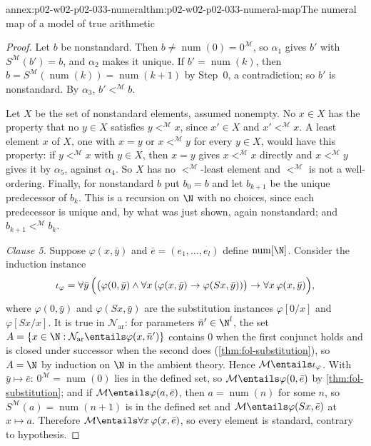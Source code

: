 \begin{annexitem}{annex:p02-w02-p02-033-numeral}{thm:p02-w02-p02-033-numeral-map}{The numeral map of a model of true arithmetic}
\begin{proof}
Let \(b\) be nonstandard.  Then \(b\ne\operatorname{num}(0)=0^{\mathcal M}\),
so \(\alpha_1\) gives \(b'\) with \(S^{\mathcal M}(b')=b\), and \(\alpha_2\)
makes it unique.  If \(b'=\operatorname{num}(k)\), then
\(b=S^{\mathcal M}(\operatorname{num}(k))=\operatorname{num}(k+1)\) by Step~0,
a contradiction; so \(b'\) is nonstandard.  By \(\alpha_3\),
\(b'<^{\mathcal M}b\).

Let \(X\) be the set of nonstandard elements, assumed nonempty.  No
\(x\in X\) has the property that no \(y\in X\) satisfies
\(y<^{\mathcal M}x\), since \(x'\in X\) and \(x'<^{\mathcal M}x\).  A least
element \(x\) of \(X\), one with \(x=y\) or \(x<^{\mathcal M}y\) for every
\(y\in X\), would have this property: if \(y<^{\mathcal M}x\) with \(y\in X\),
then \(x=y\) gives \(x<^{\mathcal M}x\) directly and \(x<^{\mathcal M}y\)
gives it by \(\alpha_5\), against \(\alpha_4\).  So \(X\) has no
\(<^{\mathcal M}\)-least element and \(<^{\mathcal M}\) is not a
well-ordering.  Finally, for nonstandard \(b\) put \(b_0=b\) and let
\(b_{k+1}\) be the unique predecessor of \(b_k\).  This is a recursion on
\(\N\) with no choices, since each predecessor is unique and, by what was
just shown, again nonstandard; and \(b_{k+1}<^{\mathcal M}b_k\).

\emph{Clause 5.}  Suppose \(\varphi(x,\bar y)\) and
\(\bar e=(e_1,\ldots,e_l)\) define \(\operatorname{num}[\N]\).  Consider the
induction instance
\[
 \iota_\varphi=\forall\bar y\,\Bigl(\bigl(\varphi(0,\bar y)\land
 \forall x\,(\varphi(x,\bar y)\to\varphi(Sx,\bar y))\bigr)\to
 \forall x\,\varphi(x,\bar y)\Bigr),
\]
where \(\varphi(0,\bar y)\) and \(\varphi(Sx,\bar y)\) are the substitution
instances \(\varphi[0/x]\) and \(\varphi[Sx/x]\).  It is true in
\(\mathcal N_{\mathrm{ar}}\): for parameters \(\bar n'\in\N^l\), the set
\(A=\{x\in\N:\mathcal N_{\mathrm{ar}}\entails\varphi(x,\bar n')\}\) contains
\(0\) when the first conjunct holds and is closed under successor when the
second does (\cref{thm:fol-substitution}), so \(A=\N\) by induction on \(\N\)
in the ambient theory.  Hence \(\mathcal M\entails\iota_\varphi\).  With
\(\bar y\mapsto\bar e\): \(0^{\mathcal M}=\operatorname{num}(0)\) lies in the
defined set, so \(\mathcal M\entails\varphi(0,\bar e)\) by
\cref{thm:fol-substitution}; and if \(\mathcal M\entails\varphi(a,\bar e)\),
then \(a=\operatorname{num}(n)\) for some \(n\), so
\(S^{\mathcal M}(a)=\operatorname{num}(n+1)\) is in the defined set and
\(\mathcal M\entails\varphi(Sx,\bar e)\) at \(x\mapsto a\).  Therefore
\(\mathcal M\entails\forall x\,\varphi(x,\bar e)\), so every element is
standard, contrary to hypothesis.
\end{proof}
\end{annexitem}

